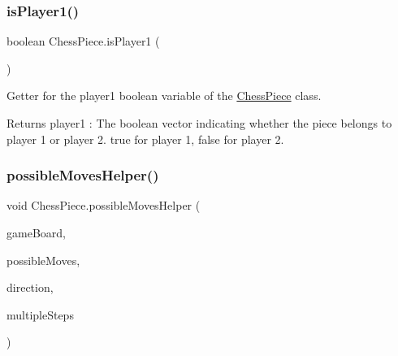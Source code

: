 \subsubsection{\texorpdfstring{is\+Player1()}{isPlayer1()}}
{\footnotesize\ttfamily boolean Chess\+Piece.\+is\+Player1 (\begin{DoxyParamCaption}{ }\end{DoxyParamCaption})}

Getter for the \textquotesingle{}player1\textquotesingle{} boolean variable of the \mbox{\hyperlink{class_chess_piece}{Chess\+Piece}} class. \begin{DoxyReturn}{Returns}
player1 \+: The boolean vector indicating whether the piece belongs to player 1 or player 2. \textquotesingle{}true\textquotesingle{} for player 1, \textquotesingle{}false\textquotesingle{} for player 2. 
\end{DoxyReturn}
\mbox{\label{class_chess_piece_a10df0b9d4c1bf1545b58c2dc9d083f48}} 
\subsubsection{\texorpdfstring{possible\+Moves\+Helper()}{possibleMovesHelper()}}
{\footnotesize\ttfamily void Chess\+Piece.\+possible\+Moves\+Helper (\begin{DoxyParamCaption}\item[{@Not\+Null \mbox{\hyperlink{class_board}{Board}}}]{game\+Board,  }\item[{@Not\+Null List$<$ int\mbox{[}$\,$\mbox{]}$>$}]{possible\+Moves,  }\item[{@Not\+Null int \mbox{[}$\,$\mbox{]}}]{direction,  }\item[{boolean}]{multiple\+Steps }\end{DoxyParamCaption})\hspace{0.3cm}{\ttfamily [protected]}}


